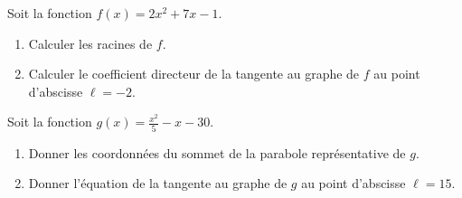 
\begin{exercice}\label{exosmath-0435}

    Soit la fonction \( f(x)=2x^2+7x-1\).
    \begin{enumerate}
        \item
            Calculer les racines de $f$.
        \item
            Calculer le coefficient directeur de la tangente au graphe de \( f\) au point d'abscisse \( \ell=-2\).
    \end{enumerate}

    Soit la fonction \( g(x)=\frac{ x^2 }{ 5 }-x-30\).
    \begin{enumerate}
        \item
            Donner les coordonnées du sommet de la parabole représentative de \( g\).
        \item
            Donner l'équation de la tangente au graphe de \( g\) au point d'abscisse \( \ell=15\).
    \end{enumerate}

\end{exercice}
